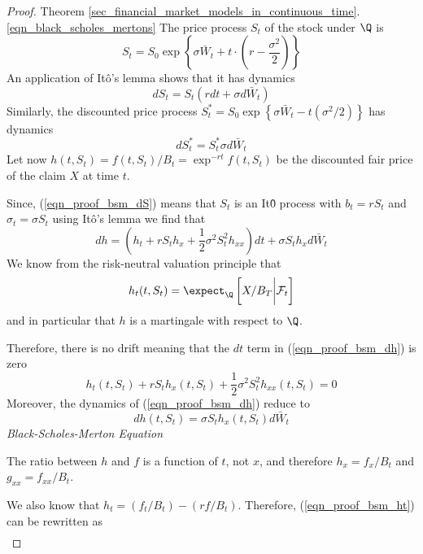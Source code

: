 \documentclass[11pt,a4paper]{article}
\begin{document}
  \begin{proof}{Theorem \ref{sec_financial_market_models_in_continuous_time}.\ref{eqn_black_scholes_mertons}}
    The price process $S_t$ of the stock under $\Q$ is
    \[ S_t=S_0\exp\left\{\sigma\bar{W}_t+t\cdot\left(r-\frac{\sigma^2}2\right)\right\} \]
    An application of It\^o's lemma shows that it has dynamics
    \begin{equation}\label{eqn_proof_bsm_dS}
      dS_t=S_t(rdt+\sigma d\bar{W}_t)
    \end{equation}
    Similarly, the discounted price process $S_t^*=S_0\exp\left\{\sigma\bar{W}_t-t(\sigma^2/2)\right\}$ has dynamics
    \begin{equation}\label{eqn_proof_bsm_dSt_star}
      dS_t^*=S_t^*\sigma d\bar{W}_t
    \end{equation}
    Let now $h(t,S_t)=f(t,S_t)/B_t=\exp^{-rt}f(t,S_t)$ be the discounted fair price of the claim $X$ at time $t$.
    \par Since, (\ref{eqn_proof_bsm_dS}) means that $S_t$ is an It\^0 process with $b_t=rS_t$ and $\sigma_t=\sigma S_t$ using It\^o's lemma we find that
    \begin{equation}\label{eqn_proof_bsm_dh}
      dh=\left(h_t+rS_th_x+\frac12\sigma^2S_t^2h_{xx}\right)dt+\sigma S_th_xd\bar{W}_t
    \end{equation}
    We know from the risk-neutral valuation principle that
    \begin{equation}\label{eqn_proof_bsm_ht}
      h_t(t,S_t)=\expect_\Q\left[X/B_T\bigg|\mathcal{F}_t\right]
    \end{equation}
    and in particular that $h$ is a martingale with respect to $\Q$.
    \par Therefore, there is no drift meaning that the $dt$ term in (\ref{eqn_proof_bsm_dh}) is zero
    \[ h_t(t,S_t)+rS_th_x(t,S_t)+\frac12\sigma^2S_t^2h_{xx}(t,S_t)=0 \]
    Moreover, the dynamics of (\ref{eqn_proof_bsm_dh}) reduce to
    \begin{equation}\label{eqn_proof_bsm_dh_2}
      dh(t,S_t)=\sigma S_th_x(t,S_t)d\bar{W}_t
    \end{equation}
    \textit{Black-Scholes-Merton Equation}
    \par The ratio between $h$ and $f$ is a function of $t$, not $x$, and therefore $h_x=f_x/B_t$ and $g_{xx}=f_{xx}/B_t$.
    \par We also know that $h_t=(f_t/B_t)-(rf/B_t)$. Therefore, (\ref{eqn_proof_bsm_ht}) can be rewritten as
    \[\begin{array}{rcl}

\end{array}\]
\end{proof}
\end{document}

